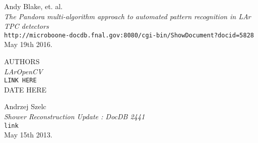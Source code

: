 


\newpage



\newpage



\newpage



\newpage



\newpage


\begin{thebibliography}{9}

Andy Blake, et. al.\\
\emph{The Pandora multi-algorithm approach to automated pattern recognition in LAr TPC detectors}\\
\texttt{http://microboone-docdb.fnal.gov:8080/cgi-bin/ShowDocument?docid=5828}\\
May 19th 2016.

AUTHORS\\
\emph{LArOpenCV}\\
\texttt{LINK HERE}\\
DATE HERE

Andrzej Szelc\\
\emph{Shower Reconstruction Update : DocDB 2441}\\
\texttt{link}\\
May 15th 2013.

\end{thebibliography}


